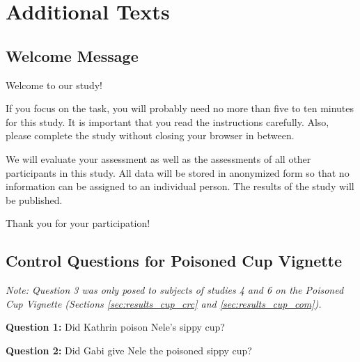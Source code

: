 \documentclass[egregdoesnotlikesansseriftitles,12pt]{scrartcl}
\begin{document}
\clearpage
\section{Additional Texts}\label{app:main_instructions}
\subsection{Welcome Message}\label{app:main_welcome}
Welcome to our study!%
	
If you focus on the task, you will probably need no more than five to ten minutes for this study. It is important that you read the instructions carefully. Also, please complete the study without closing your browser in between.%
	
We will evaluate your assessment as well as the assessments of all other participants in this study. All data will be stored in anonymized form so that no information can be assigned to an individual person. The results of the study will be published.%
	
Thank you for your participation!%

\subsection{Control Questions for Poisoned Cup Vignette}\label{app:main_cup_control}
\noindent\textit{Note: Question 3 was only posed to subjects of studies 4 and 6 on the Poisoned Cup Vignette (Sections \ref{sec:results_cup_crc} and \ref{sec:results_cup_com}).}

\vspace{1ex}
\noindent\textbf{Question 1:} Did Kathrin poison Nele's sippy cup?%

\vspace{1ex}
\noindent\textbf{Question 2:} Did Gabi give Nele the poisoned sippy cup?%
\end{document}
